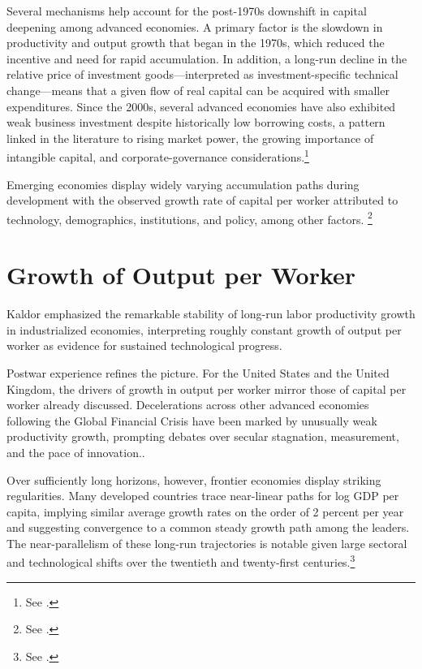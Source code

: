 \documentclass[\topdir/lecture\_notes.tex]{subfiles}
\begin{document}
Several mechanisms help account for the post-1970s downshift in capital deepening among advanced economies.
A primary factor is the slowdown in productivity and output growth that began in the 1970s, which reduced the incentive and need for rapid accumulation.
In addition, a long-run decline in the relative price of investment goods---interpreted as investment-specific technical change---means that a given flow of real capital can be acquired with smaller expenditures.
Since the 2000s, several advanced economies have also exhibited weak business investment despite historically low borrowing costs, a pattern linked in the literature to rising market power, the growing importance of intangible capital, and corporate-governance considerations.\footnote{See \parencite{greenwoodhercowitzkrusell1997,byrneolinersichel2017,gutierrezphilippon2017,crouzeteberly2019,deloecker2020markups,corradohultensichel2005,karabarbounis2014global,eggertsson2018kaldor,gordon2016rise,fernald2015productivity,oecd2015productivity}.}

Emerging economies display widely varying accumulation paths during development with the observed growth rate of capital per worker attributed to technology, demographics, institutions, and policy, among other factors. \footnote{See \parencite{solow1956contribution,barrosalaimartin2003,acemoglu2009growth,jones2016facts}.}

\section{Growth of Output per Worker}

Kaldor emphasized the remarkable stability of long-run labor productivity growth in industrialized economies, interpreting roughly constant growth of output per worker as evidence for sustained technological progress.

Postwar experience refines the picture.
For the United States and the United Kingdom, the drivers of growth in output per worker mirror those of capital per worker already discussed.
Decelerations across other advanced economies following the Global Financial Crisis have been marked by unusually weak productivity growth, prompting debates over secular stagnation, measurement, and the pace of innovation.\parencite{oecd2015productivity,gordon2016rise,byrnefernaldreinsdorf2016,syverson2017}.

Over sufficiently long horizons, however, frontier economies display striking regularities.
Many developed countries trace near-linear paths for log GDP per capita, implying similar average growth rates on the order of 2 percent per year and suggesting convergence to a common steady growth path among the leaders.
The near-parallelism of these long-run trajectories is notable given large sectoral and technological shifts over the twentieth and twenty-first centuries.\footnote{See \parencite{vollrath2020fullygrown,jones2016facts}.}
\end{document}
